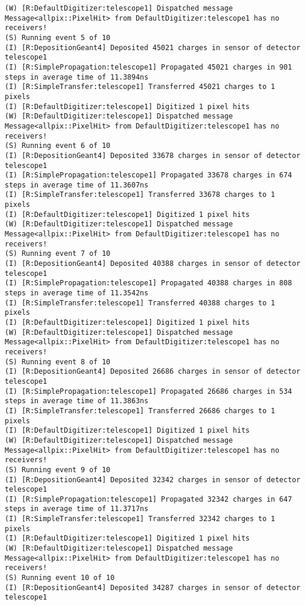 \begin{lstlisting}[breaklines]
(W) [R:DefaultDigitizer:telescope1] Dispatched message Message<allpix::PixelHit> from DefaultDigitizer:telescope1 has no receivers!
(S) Running event 5 of 10
(I) [R:DepositionGeant4] Deposited 45021 charges in sensor of detector telescope1
(I) [R:SimplePropagation:telescope1] Propagated 45021 charges in 901 steps in average time of 11.3894ns
(I) [R:SimpleTransfer:telescope1] Transferred 45021 charges to 1 pixels
(I) [R:DefaultDigitizer:telescope1] Digitized 1 pixel hits
(W) [R:DefaultDigitizer:telescope1] Dispatched message Message<allpix::PixelHit> from DefaultDigitizer:telescope1 has no receivers!
(S) Running event 6 of 10
(I) [R:DepositionGeant4] Deposited 33678 charges in sensor of detector telescope1
(I) [R:SimplePropagation:telescope1] Propagated 33678 charges in 674 steps in average time of 11.3607ns
(I) [R:SimpleTransfer:telescope1] Transferred 33678 charges to 1 pixels
(I) [R:DefaultDigitizer:telescope1] Digitized 1 pixel hits
(W) [R:DefaultDigitizer:telescope1] Dispatched message Message<allpix::PixelHit> from DefaultDigitizer:telescope1 has no receivers!
(S) Running event 7 of 10
(I) [R:DepositionGeant4] Deposited 40388 charges in sensor of detector telescope1
(I) [R:SimplePropagation:telescope1] Propagated 40388 charges in 808 steps in average time of 11.3542ns
(I) [R:SimpleTransfer:telescope1] Transferred 40388 charges to 1 pixels
(I) [R:DefaultDigitizer:telescope1] Digitized 1 pixel hits
(W) [R:DefaultDigitizer:telescope1] Dispatched message Message<allpix::PixelHit> from DefaultDigitizer:telescope1 has no receivers!
(S) Running event 8 of 10
(I) [R:DepositionGeant4] Deposited 26686 charges in sensor of detector telescope1
(I) [R:SimplePropagation:telescope1] Propagated 26686 charges in 534 steps in average time of 11.3863ns
(I) [R:SimpleTransfer:telescope1] Transferred 26686 charges to 1 pixels
(I) [R:DefaultDigitizer:telescope1] Digitized 1 pixel hits
(W) [R:DefaultDigitizer:telescope1] Dispatched message Message<allpix::PixelHit> from DefaultDigitizer:telescope1 has no receivers!
(S) Running event 9 of 10
(I) [R:DepositionGeant4] Deposited 32342 charges in sensor of detector telescope1
(I) [R:SimplePropagation:telescope1] Propagated 32342 charges in 647 steps in average time of 11.3717ns
(I) [R:SimpleTransfer:telescope1] Transferred 32342 charges to 1 pixels
(I) [R:DefaultDigitizer:telescope1] Digitized 1 pixel hits
(W) [R:DefaultDigitizer:telescope1] Dispatched message Message<allpix::PixelHit> from DefaultDigitizer:telescope1 has no receivers!
(S) Running event 10 of 10
(I) [R:DepositionGeant4] Deposited 34287 charges in sensor of detector telescope1

\end{lstlisting}
